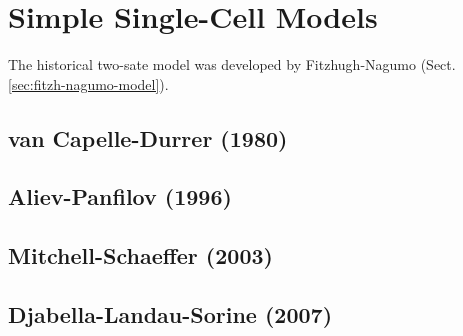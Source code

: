 \chapter{Simple Single-Cell Models}

The historical two-sate model was developed by Fitzhugh-Nagumo
(Sect.\ref{sec:fitzh-nagumo-model}). 

\section{van Capelle-Durrer (1980)}
\label{sec:vanCapelle-Durrer}


\citep{capelle1980} 

\section{Aliev-Panfilov (1996)}
\label{sec:aliev-panfilov}

\citep{aliev1996}

\section{Mitchell-Schaeffer (2003)}
\label{sec:mitchell-schaeffer}

\citep{mitchell2003}

\section{Djabella-Landau-Sorine (2007)}
\label{sec:djabella2007}

\citep{djabella2007}

